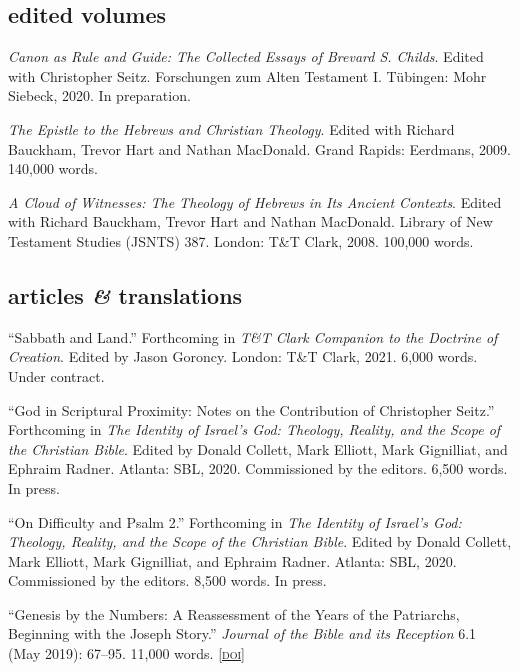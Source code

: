 \documentclass[11pt]{article}
\newcommand{\amper}{\emph{\&}}
\newcommand{\doi}[1]{\href{https://doi.org/#1}{\footnotesize\textsc{[doi]}}}
\newcommand{\years}[1]{\marginnote{\footnotesize #1}}
\begin{document}
\subsection*{edited volumes}

\years{2020}
\emph{Canon as Rule and Guide: The Collected Essays of Brevard S.
Childs}. Edited with Christopher Seitz. Forschungen zum Alten
Testament I. Tübingen: Mohr Siebeck, 2020. In preparation.

\years{2009}
\emph{The Epistle to the Hebrews and Christian Theology}. Edited with
Richard Bauckham, Trevor Hart and Nathan MacDonald. Grand Rapids:
Eerdmans, 2009. 140,000 words.

\years{2008}
\emph{A Cloud of Witnesses: The Theology of Hebrews in Its Ancient
Contexts}. Edited with Richard Bauckham, Trevor Hart and Nathan
MacDonald. Library of New Testament Studies (JSNTS) 387. London: T\&T
Clark, 2008. 100,000 words.

\subsection*{articles \amper{} translations}

\years{2021}
``Sabbath and Land.'' Forthcoming in \emph{T\&T Clark Companion to the
Doctrine of Creation}. Edited by Jason Goroncy. London: T\&T Clark,
2021. 6,000 words. Under contract.

\years{2020}
``God in Scriptural Proximity: Notes on the Contribution of Christopher
Seitz.'' Forthcoming in \emph{The Identity of Israel’s God: Theology,
Reality, and the Scope of the Christian Bible}. Edited by Donald
Collett, Mark Elliott, Mark Gignilliat, and Ephraim Radner. Atlanta:
SBL, 2020. Commissioned by the editors. 6,500 words. In press.

\years{2020}
``On Difficulty and Psalm 2.'' Forthcoming in \emph{The Identity of
Israel’s God: Theology, Reality, and the Scope of the Christian Bible}.
Edited by Donald Collett, Mark Elliott, Mark Gignilliat, and Ephraim
Radner. Atlanta: SBL, 2020. Commissioned by the editors. 8,500 words. In
press.

\years{2019}
``Genesis by the Numbers: A Reassessment of the Years of the Patriarchs,
Beginning with the Joseph Story.'' \emph{Journal of the Bible and its
Reception} 6.1 (May 2019): 67–95. 11,000 words.
\doi{10.1515/jbr-2019-1003}
\end{document}
